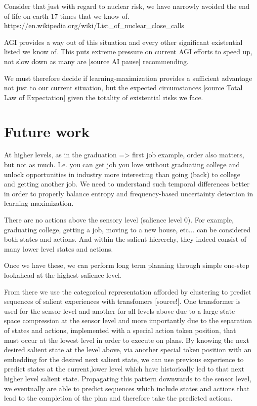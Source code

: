 \documentclass{article}
\begin{document}
Consider that just with regard to nuclear risk, we have narrowly
avoided the end of life on earth 17 times that we know of. https://en.wikipedia.org/wiki/List_of_nuclear_close_calls

AGI provides a way out of this situation and every other
significant existential listed we know of.
This puts extreme pressure on current AGI efforts to speed up,
not slow down as many are [source AI pause] recommending.

We must therefore decide if learning-maximization provides
a sufficient advantage not just to our current situation,
but the expected circumstances [source Total Law of Expectation]
given the totality of existential risks we face.

\section{Future work}

At higher levels, as in the graduation => first job example,
order also matters, but not as much. I.e. you can get job you
love without graduating college and unlock opportunities in industry
more interesting than going (back) to college and getting another job.
We need to understand such temporal differences better in order
to properly balance entropy and frequency-based uncertainty detection
in learning maximization.

There are no actions above the sensory level (salience level 0). For example,
graduating college, getting a job, moving to a new house, etc...
can be considered both states and actions. And within the salient
hiererchy, they indeed consist of many lower level states and actions.


Once we have these, we can perform long term planning through simple one-step
lookahead at the highest salience level.

From there we use the categorical representation afforded by clustering to predict
sequences of salient experiences with transfomers [source!]. One transformer is used
for the sensor level and another for all levels above due to
a large state space compression at the sensor level and more
importantly due to the separation of states and actions,
implemented with a special action token position, that must
occur at the lowest level in order to execute on plans.
By knowing the next desired salient state at the level above,
via another special token position with an embedding for the
desired next salient state, we can use
previous experience to predict states at the current,lower level
which have historically led to that next higher level salient state.
Propagating this pattern downwards to the sensor level, we eventually
are able to predict sequences which include states and actions
that lead to the completion of the plan and therefore take the
predicted actions.
\end{document}
